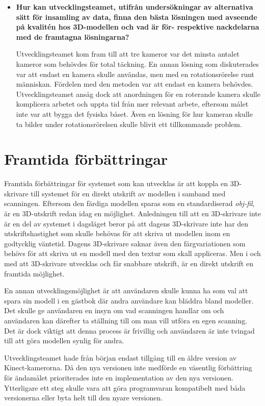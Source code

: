 \documentclass[a4paper,12pt,oneside,final]{extbook}
\begin{document}
\begin{itemize}
\item \textbf{Hur kan utvecklingsteamet, utifrån undersökningar av alternativa sätt för insamling av data, finna den bästa lösningen med avseende på kvalitén hos 3D-modellen och vad är för- respektive nackdelarna med de framtagna lösningarna?}

Utvecklingsteamet kom fram till att tre kameror var det minsta antalet kameror som behövdes för total täckning. En annan lösning som diskuterades var att endast en kamera skulle användas, men med en rotationsrörelse runt människan. Fördelen med den metoden var att endast en kamera behövdes. Utvecklingsteamet ansåg dock att anordningen för en roterande kamera skulle komplicera arbetet och uppta tid från mer relevant arbete, eftersom målet inte var att bygga det fysiska båset. Även en lösning för hur kameran skulle ta bilder under rotationsrörelsen skulle blivit ett tillkommande problem.
\end{itemize}





\section{Framtida förbättringar}
Framtida förbättringar för systemet som kan utvecklas är att koppla en 3D-skrivare till systemet för en direkt utskrift av modellen i samband med scanningen. Eftersom den färdiga modellen sparas som en standardiserad \emph{obj-fil}, är en 3D-utskrift redan idag en möjlighet. Anledningen till att en 3D-skrivare inte är en del av systemet i dagsläget beror på att dagens 3D-skrivare inte har den utskriftshastighet som skulle behövas för att skriva ut modellen inom en godtycklig väntetid. Dagens 3D-skrivare saknar även den färgvariationen som behövs för att skriva ut en modell med den textur som skall appliceras. Men i och med att 3D-skrivare utvecklas och får snabbare utskrift, är en direkt utskrift en framtida möjlighet.

En annan utvecklingsmöjlighet är att användaren skulle kunna ha som val att spara sin modell i en gästbok där andra användare kan bläddra bland modeller. Det skulle ge användaren en insyn om vad scanningen handlar om och användaren kan därefter ta ställning till om man vill utföra en egen scanning. Det är dock viktigt att denna process är frivillig och användaren är inte tvingad till att göra modellen synlig för andra.

Utvecklingsteamet hade från början endast tillgång till en äldre version av Kinect-kamerorna. Då den nya versionen inte medförde en väsentlig förbättring för ändamålet prioriterades inte en implementation av den nya versionen. Ytterligare ett steg skulle vara att göra programvaran kompatibelt med båda versionerna eller byta helt till den nyare versionen.
\end{document}
